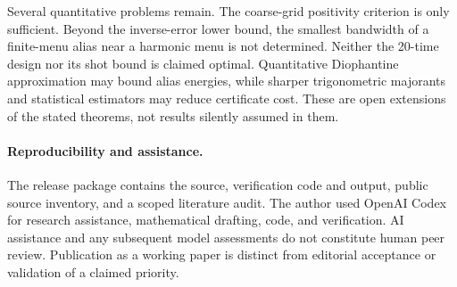 \documentclass[11pt,a4paper]{article}
\theoremstyle{remark}\newtheorem{remark}[theorem]{Remark}
\begin{document}
Several quantitative problems remain. The coarse-grid positivity
criterion is only sufficient. Beyond the inverse-error lower bound,
the smallest bandwidth of a finite-menu alias near a harmonic menu is
not determined. Neither the
20-time design nor its shot bound is claimed optimal. Quantitative
Diophantine approximation may bound alias energies, while sharper
trigonometric majorants and statistical estimators may reduce certificate
cost. These are open extensions of the stated theorems, not results
silently assumed in them.

\paragraph{Reproducibility and assistance.}
The release package contains the source, verification code and output,
public source inventory, and a scoped literature audit. The author used
OpenAI Codex for research assistance, mathematical drafting, code, and
verification. AI assistance and any subsequent model assessments do not
constitute human peer review. Publication as a working paper is distinct
from editorial acceptance or validation of a claimed priority.
\end{document}
